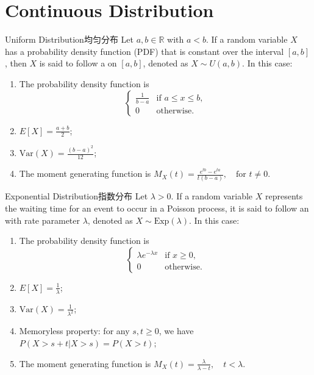 \documentclass[../main.tex]{subfiles}
\begin{document}
\section{Continuous Distribution}
\begin{proposition}{Uniform Distribution}{均匀分布}
Let $a, b \in \mathbb{R}$ with $a < b$. If a random variable $X$ has a probability density function (PDF) that is constant over the interval $[a,b]$, then $X$ is said to follow a  on $[a,b]$, denoted as $X \sim U(a,b)$. In this case:
\begin{enumerate}
\item The probability density function is
$$\begin{cases} 
\frac{1}{b-a} & \text{if } a \le x \le b, \\
0 & \text{otherwise}.
\end{cases}$$
\item $E[X] = \frac{a+b}{2}$;
\item $\text{Var}(X) = \frac{(b-a)^2}{12}$;
\item The moment generating function is
$M_X(t) = \frac{e^{tb}-e^{ta}}{t(b-a)}, \quad \text{for } t \neq 0.$
\end{enumerate}
\end{proposition}
\begin{proposition}{Exponential Distribution}{指数分布}
Let $\lambda > 0$. If a random variable $X$ represents the waiting time for an event to occur in a Poisson process, it is said to follow an  with rate parameter $\lambda$, denoted as $X \sim \text{Exp}(\lambda)$. In this case:
\begin{enumerate}
\item The probability density function is
$$\begin{cases} 
\lambda e^{-\lambda x} & \text{if } x \ge 0, \\
0 & \text{otherwise}.
\end{cases}$$
\item $E[X] = \frac{1}{\lambda}$;
\item $\text{Var}(X) = \frac{1}{\lambda^2}$;
\item Memoryless property: for any $s, t \ge 0$, we have
$P(X > s+t | X > s) = P(X > t);$
\item The moment generating function is
$M_X(t) = \frac{\lambda}{\lambda-t}, \quad t < \lambda.$
\end{enumerate}
\end{proposition}
\end{document}
